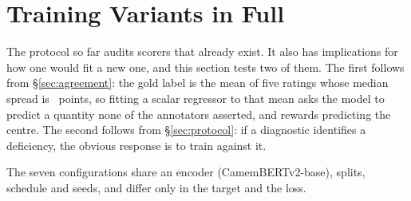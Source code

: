 \documentclass[11pt]{article}
\begin{document}
\section{Training Variants in Full}
\label{app:variants}

The protocol so far audits scorers that already exist. It also has implications
for how one would fit a new one, and this section tests two of them. The first
follows from \S\ref{sec:agreement}: the gold label is the mean of five ratings
whose median spread is \medianRange\ points, so fitting a scalar regressor to
that mean asks the model to predict a quantity none of the annotators asserted,
and rewards predicting the centre. The second follows from
\S\ref{sec:protocol}: if a diagnostic identifies a deficiency, the obvious
response is to train against it.

The seven configurations share an encoder (CamemBERTv2-base), splits, schedule
and seeds, and differ only in the target and the loss.
\end{document}

